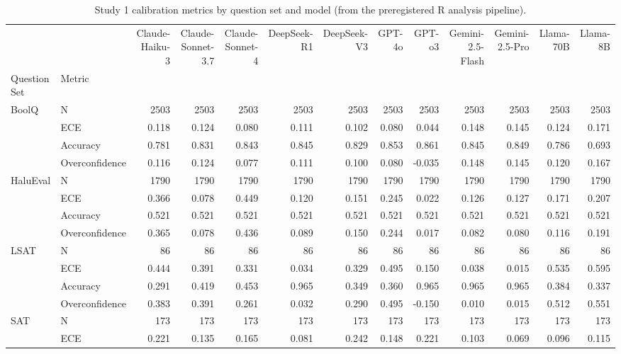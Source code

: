 \begin{table}
\caption{Study 1 calibration metrics by question set and model (from the preregistered R analysis pipeline).}
\label{tab:study1_table1}
\begin{tabular}{llrrrrrrrrrrr}
\toprule
 &  & Claude-Haiku-3 & Claude-Sonnet-3.7 & Claude-Sonnet-4 & DeepSeek-R1 & DeepSeek-V3 & GPT-4o & GPT-o3 & Gemini-2.5-Flash & Gemini-2.5-Pro & Llama-70B & Llama-8B \\
Question Set & Metric &  &  &  &  &  &  &  &  &  &  &  \\
\midrule
\multirow[t]{4}{*}{BoolQ} & N & 2503 & 2503 & 2503 & 2503 & 2503 & 2503 & 2503 & 2503 & 2503 & 2503 & 2503 \\
 & ECE & 0.118 & 0.124 & 0.080 & 0.111 & 0.102 & 0.080 & 0.044 & 0.148 & 0.145 & 0.124 & 0.171 \\
 & Accuracy & 0.781 & 0.831 & 0.843 & 0.845 & 0.829 & 0.853 & 0.861 & 0.845 & 0.849 & 0.786 & 0.693 \\
 & Overconfidence & 0.116 & 0.124 & 0.077 & 0.111 & 0.100 & 0.080 & -0.035 & 0.148 & 0.145 & 0.120 & 0.167 \\
\cline{1-13}
\multirow[t]{4}{*}{HaluEval} & N & 1790 & 1790 & 1790 & 1790 & 1790 & 1790 & 1790 & 1790 & 1790 & 1790 & 1790 \\
 & ECE & 0.366 & 0.078 & 0.449 & 0.120 & 0.151 & 0.245 & 0.022 & 0.126 & 0.127 & 0.171 & 0.207 \\
 & Accuracy & 0.521 & 0.521 & 0.521 & 0.521 & 0.521 & 0.521 & 0.521 & 0.521 & 0.521 & 0.521 & 0.521 \\
 & Overconfidence & 0.365 & 0.078 & 0.436 & 0.089 & 0.150 & 0.244 & 0.017 & 0.082 & 0.080 & 0.116 & 0.191 \\
\cline{1-13}
\multirow[t]{4}{*}{LSAT} & N & 86 & 86 & 86 & 86 & 86 & 86 & 86 & 86 & 86 & 86 & 86 \\
 & ECE & 0.444 & 0.391 & 0.331 & 0.034 & 0.329 & 0.495 & 0.150 & 0.038 & 0.015 & 0.535 & 0.595 \\
 & Accuracy & 0.291 & 0.419 & 0.453 & 0.965 & 0.349 & 0.360 & 0.965 & 0.965 & 0.965 & 0.384 & 0.337 \\
 & Overconfidence & 0.383 & 0.391 & 0.261 & 0.032 & 0.290 & 0.495 & -0.150 & 0.010 & 0.015 & 0.512 & 0.551 \\
\cline{1-13}
\multirow[t]{4}{*}{SAT} & N & 173 & 173 & 173 & 173 & 173 & 173 & 173 & 173 & 173 & 173 & 173 \\
 & ECE & 0.221 & 0.135 & 0.165 & 0.081 & 0.242 & 0.148 & 0.221 & 0.103 & 0.069 & 0.096 & 0.115 \\

\end{tabular}
\end{table}

